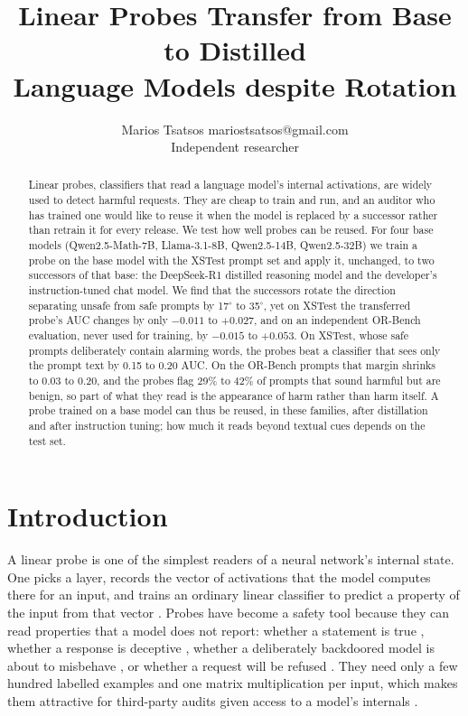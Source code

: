 \documentclass[10pt]{article}
\title{Linear Probes Transfer from Base to Distilled\\Language Models despite Rotation}
\author{\name Marios Tsatsos \email mariostsatsos@gmail.com \\
      \addr Independent researcher}
\begin{document}
\maketitle

\begin{abstract}
Linear probes, classifiers that read a language model's internal activations, are widely used to detect harmful requests. They are cheap to train and run, and an auditor who has trained one would like to reuse it when the model is replaced by a successor rather than retrain it for every release. We test how well probes can be reused. For four base models (Qwen2.5-Math-7B, Llama-3.1-8B, Qwen2.5-14B, Qwen2.5-32B) we train a probe on the base model with the XSTest prompt set and apply it, unchanged, to two successors of that base: the DeepSeek-R1 distilled reasoning model and the developer's instruction-tuned chat model. We find that the successors rotate the direction separating unsafe from safe prompts by 17$^\circ$ to 35$^\circ$, yet on XSTest the transferred probe's AUC changes by only $-0.011$ to $+0.027$, and on an independent OR-Bench evaluation, never used for training, by $-0.015$ to $+0.053$. On XSTest, whose safe prompts deliberately contain alarming words, the probes beat a classifier that sees only the prompt text by 0.15 to 0.20 AUC. On the OR-Bench prompts that margin shrinks to 0.03 to 0.20, and the probes flag 29\% to 42\% of prompts that sound harmful but are benign, so part of what they read is the appearance of harm rather than harm itself. A probe trained on a base model can thus be reused, in these families, after distillation and after instruction tuning; how much it reads beyond textual cues depends on the test set.
\end{abstract}

\section{Introduction}
\label{sec:intro}

A linear probe is one of the simplest readers of a neural network's internal state. One picks a layer, records the vector of activations that the model computes there for an input, and trains an ordinary linear classifier to predict a property of the input from that vector \citep{alain2016,belinkov2022}. Probes have become a safety tool because they can read properties that a model does not report: whether a statement is true \citep{azaria2023}, whether a response is deceptive \citep{goldowskydill2025}, whether a deliberately backdoored model is about to misbehave \citep{macdiarmid2024}, or whether a request will be refused \citep{arditi2024}. They need only a few hundred labelled examples and one matrix multiplication per input, which makes them attractive for third-party audits given access to a model's internals \citep{casper2024}.
\end{document}

